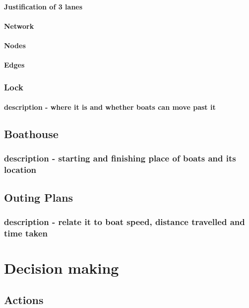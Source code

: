         \paragraph{Justification of 3 lanes}
        \paragraph{Network}
        \paragraph{Nodes}
        \paragraph{Edges}
        
      \subsubsection{Lock}
        \paragraph{description - where it is and whether boats can move past it}
        
    \subsection{Boathouse}
      \subsubsection{description - starting and finishing place of boats and its location}
    
    \subsection{Outing Plans}
      \subsubsection{description - relate it to boat speed, distance travelled and time taken}
    
  \section{Decision making}
    \subsection{Actions}
